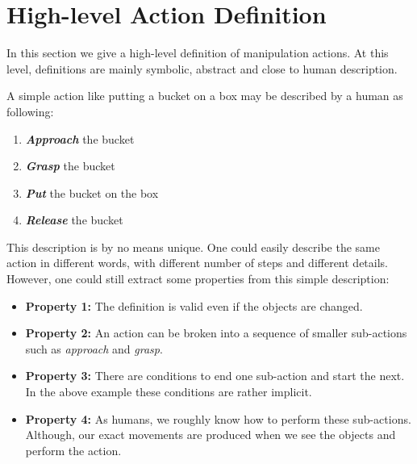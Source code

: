 \section{High-level Action Definition}
\label{sec:high-level}
In this section we give a high-level definition of manipulation actions.
At this level, definitions are mainly symbolic, abstract and close to human description.

A simple action like putting a bucket on a box may be described by a human as following:
\begin{enumerate}
  \item \textbf{\textit{Approach}} the bucket
  \item \textbf{\textit{Grasp}} the bucket
  \item \textbf{\textit{Put}} the bucket on the box
  \item \textbf{\textit{Release}} the bucket
\end{enumerate}
This description is by no means unique.
One could easily describe the same action in different words, with different number of steps and different details.
However, one could still extract some properties from this simple description:
\begin{itemize}
  \item \textbf{Property 1:} The definition is valid even if the objects are changed.
  \item \textbf{Property 2:} An action can be broken into a sequence of smaller sub-actions such as \textit{approach} and \textit{grasp}.
  \item \textbf{Property 3:} There are conditions to end one sub-action and start the next. In the above example these conditions are rather implicit.
  \item \textbf{Property 4:} As humans, we roughly know how to perform these sub-actions.
  Although, our exact movements are produced when we see the objects and perform the action.
\end{itemize}



